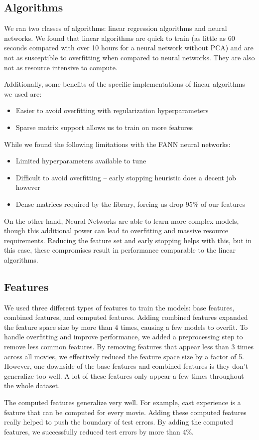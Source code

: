 \documentclass[journal]{IEEEtran}
\begin{document}
\subsection{Algorithms}
We ran two classes of algorithms: linear regression algorithms and neural networks. We found that
linear algorithms are quick to train (as little as 60 seconds compared with over 10 hours
for a neural network without PCA) and are not as susceptible to overfitting when compared to neural networks.
They are also not as resource intensive to compute.
\\
\par Additionally, some benefits of the specific implementations of linear algorithms we used are:
\begin{itemize}
    \item Easier to avoid overfitting with regularization hyperparameters
    \item Sparse matrix support allows us to train on more features
\end{itemize}
\bigskip
\par While we found the following limitations with the FANN neural networks:
\begin{itemize}
    \item Limited hyperparameters available to tune
    \item Difficult to avoid overfitting -- early stopping heuristic does a decent job however
    \item Dense matrices required by the library, forcing us drop 95\% of our features
\end{itemize}
\bigskip
\par On the other hand, Neural Networks are able to learn more complex models, though this additional
power can lead to overfitting and massive resource requirements. Reducing the feature set and early stopping helps with this, but in this
case, these compromises result in performance comparable to the linear
algorithms.

\subsection{Features}
We used three different types of features to train the models: base features, combined features, and computed features. Adding combined features expanded the feature space size by more than 4 times, causing a few models to overfit. To handle overfitting and improve performance, we added a preprocessing step to remove less common features. By removing features that appear less than 3 times across all movies, we effectively reduced the feature space size by a factor of 5. However, one downside of the base features and combined features is they don't generalize too well. A lot of these features only appear a few times throughout the whole dataset.
\\
\par The computed features generalize very well. For example, cast experience is a feature that can be computed for every movie. Adding these computed features really helped to push the boundary of test errors. By adding the computed features, we successfully reduced test errors by more than 4\%.
\end{document}

